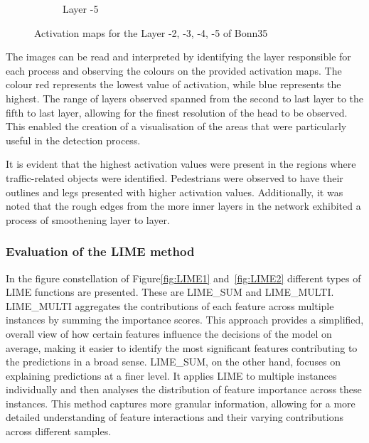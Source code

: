 \begin{figure}[h]
\begin{subfigure}[b]{0.49\textwidth}
        \caption{Layer -5}
        \label{fig:-5}
    \end{subfigure}
    \hfill

    \caption{Activation maps for the Layer -2, -3, -4, -5 of Bonn35}
    \label{fig:Bonn_000035_000019}
\end{figure}

The images can be read and interpreted by identifying the layer responsible for each process and observing the colours on the provided activation maps.
The colour red represents the lowest value of activation, while blue represents the highest.
The range of layers observed spanned from the second to last layer to the fifth to last layer,
allowing for the finest resolution of the head to be observed.
This enabled the creation of a visualisation of the areas that were particularly useful in the detection process.

It is evident that the highest activation values were present in the regions where traffic-related objects were identified.
Pedestrians were observed to have their outlines and legs presented with higher activation values.
Additionally, it was noted that the rough edges from the more inner layers in the network exhibited a process of smoothening layer to layer.

\subsubsection{Evaluation of the LIME method}\label{subsubsec:evaluation-of-the-lime-method}
In the figure constellation of Figure\ref{fig:LIME1} and~\ref{fig:LIME2} different types of LIME functions are presented.
These are LIME\_SUM and LIME\_MULTI\@.
LIME\_MULTI aggregates the contributions of each feature across multiple instances by summing the importance scores.
This approach provides a simplified, overall view of how certain features influence the decisions of the model on average,
making it easier to identify the most significant features contributing to the predictions in a broad sense.
LIME\_SUM, on the other hand, focuses on explaining predictions at a finer level.
It applies LIME to multiple instances individually and then analyses the distribution of feature importance across these instances.
This method captures more granular information, allowing for a more detailed understanding of feature interactions and their varying contributions across different samples.

